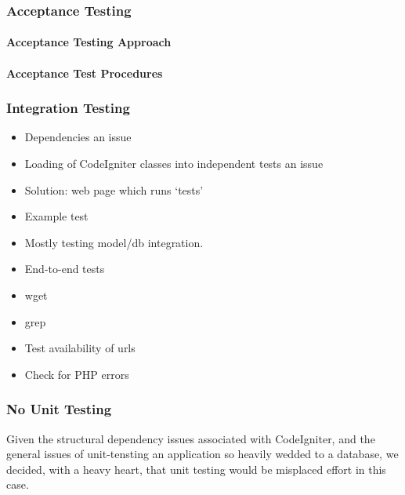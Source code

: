 \subsubsection{Acceptance Testing}

\paragraph{Acceptance Testing Approach}

\paragraph{Acceptance Test Procedures}

\subsubsection{Integration Testing}

\begin{itemize}
\item Dependencies an issue
\item Loading of CodeIgniter classes into independent tests an issue
\item Solution: web page which runs `tests'
\item Example test
\item Mostly testing model/db integration.
\end{itemize}

\begin{itemize}
\item End-to-end tests
\item wget
\item grep
\item Test availability of urls
\item Check for PHP errors
\end{itemize}

\subsubsection{No Unit Testing}

Given the structural dependency issues associated with CodeIgniter,
and the general issues of unit-tensting an application so heavily
wedded to a database, we decided, with a heavy heart, that unit
testing would be misplaced effort in this case.
